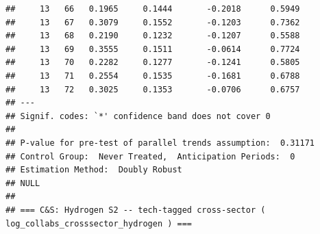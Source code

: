 \documentclass[
]{article}
\begin{document}
\begin{verbatim}
##     13   66   0.1965     0.1444       -0.2018      0.5949  
##     13   67   0.3079     0.1552       -0.1203      0.7362  
##     13   68   0.2190     0.1232       -0.1207      0.5588  
##     13   69   0.3555     0.1511       -0.0614      0.7724  
##     13   70   0.2282     0.1277       -0.1241      0.5805  
##     13   71   0.2554     0.1535       -0.1681      0.6788  
##     13   72   0.3025     0.1353       -0.0706      0.6757  
## ---
## Signif. codes: `*' confidence band does not cover 0
## 
## P-value for pre-test of parallel trends assumption:  0.31171
## Control Group:  Never Treated,  Anticipation Periods:  0
## Estimation Method:  Doubly Robust
## NULL
## 
## === C&S: Hydrogen S2 -- tech-tagged cross-sector ( log_collabs_crosssector_hydrogen ) ===
\end{verbatim}
\end{document}
